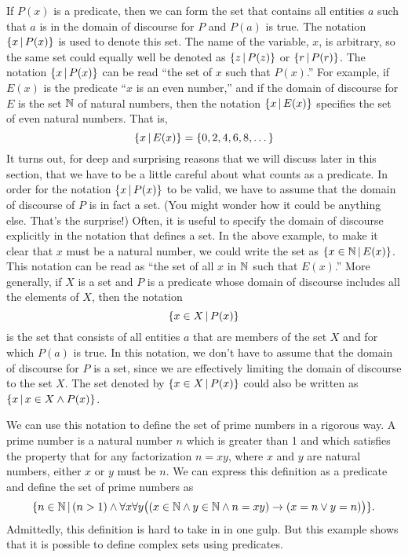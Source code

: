 If $P(x)$ is a predicate, then we can form the set that contains all entities $a$ such
that $a$ is in the domain of discourse for $P$ and $P(a)$ is true.  The
notation $\{x \,|\, P(x)\}$ is used to denote this set.  The name of the variable,
$x$, is arbitrary, so the same set could equally well be denoted as 
$\{z\,|\, P(z)\}$ or $\{r\,|\, P(r)\}$.   The notation $\{x\,|\, P(x)\}$ can be read
``the set of $x$ such that $P(x)$.''  For example, if $E(x)$ is the predicate
``$x$ is an even number,'' and if the domain of discourse for $E$ is the 
set ${\mathbb N}$ of natural numbers, then the notation $\{x\,|\, E(x)\}$ specifies the 
set of even natural numbers.  That is, 
\[\{x\,|\, E(x)\} = \{0,2,4,6,8,\dots\}\]
It turns out, for deep and surprising reasons that we will discuss later in this
section, 
that we have to be a little careful about what
counts as a predicate.  
In order for the notation $\{x\,|\, P(x)\}$ to be valid,
we have to assume that the domain of discourse of $P$ is in fact a set.  
(You might wonder how it could be anything else.  That's the surprise!)
Often, it is useful to specify the domain of discourse explicitly in 
the notation that defines a set.  In the above example, to make it clear that $x$ must 
be a natural number, we could write the set as $\{x\in{\mathbb N} \,|\,  E(x)\}$.  This notation 
can be read as ``the set of all $x$ in ${\mathbb N}$ such that $E(x)$.''  More generally,
if $X$ is a set and $P$ is a predicate whose domain of discourse includes
all the elements of $X$, then the notation
\[\{x\in X\,|\, P(x)\}\]
is the set that consists of all entities $a$ that are members of the set $X$ and
for which $P(a)$ is true.  In this notation, we don't have to assume that the
domain of discourse for $P$ is a set, since we are effectively limiting the
domain of discourse to the set $X$.  The set denoted by $\{x\in X\,|\, P(x)\}$ could
also be written as $\{x\,|\, x\in X\wedge P(x)\}$.

We can use this notation to define the set of prime numbers in a rigorous
way.  A prime number is a natural number $n$ which is greater than 1 and which
satisfies the property that for any factorization $n=xy$, where $x$ and $y$ are
natural numbers, either $x$ or $y$ must be $n$.  We can express this definition
as a predicate and define the set of prime numbers as
\[\{n\in{\mathbb N}\,|\, (n>1)\wedge\forall x\forall y\big((x\in{\mathbb N}\wedge y\in{\mathbb N}\wedge n=xy)\rightarrow(x=n\vee y=n)\big)\}.\]
Admittedly, this definition is hard to take in in one gulp.  But this example
shows that it is possible to define complex sets using predicates.




